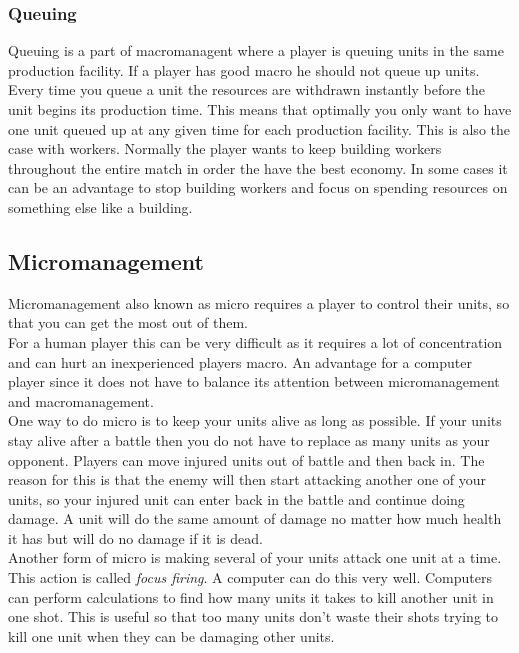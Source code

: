 			\subsubsection{Queuing}
				Queuing is a part of macromanagent where a player is queuing units in the same production facility.	If a player has good macro he should not queue up units. 
				Every time you queue a unit the resources are withdrawn instantly before the unit begins its production time. This means that optimally you only want to have one unit
 				queued up at any given time for each production facility. This is also the case with workers. Normally the player wants to keep building workers throughout the entire match
				in order the have the best economy. In some cases it can be an advantage to stop building workers and focus on spending resources on something else like a building.
				
				
	\subsection{Micromanagement}
		Micromanagement also known as micro requires a player to control their units, so that you can get the most out of them.\\
		
		For a human player this can be very difficult as it requires a lot of concentration and can hurt an inexperienced players macro. 
		An advantage for a computer player since it does not have to balance its attention between micromanagement and macromanagement.\\
		
		One way to do micro is to keep your units alive as long as possible. 
		If your units stay alive after a battle then you do not have to replace as many units as your opponent. 
		Players can move injured units out of battle and then back in. 
		The reason for this is that the enemy will then start attacking another one of your 
		units, so your injured unit can enter back in the battle and continue doing damage. 
		A unit will do the same amount of damage no matter how much health it has but will do no damage if it is dead.\\
		
		Another form of micro is making several of your units attack one unit at a time. This action is called \textit{focus firing}.
		A computer can do this very well. Computers can perform calculations to find how many units it takes to kill another unit in one shot.
		This is useful so that too many units don't waste their shots trying to kill one unit when they can be damaging other units.\\

